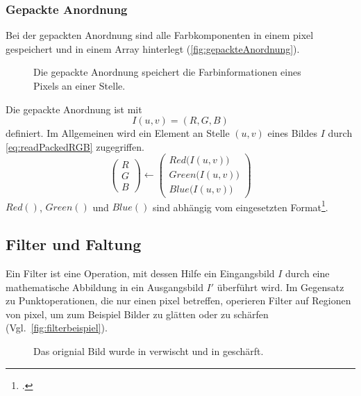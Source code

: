 \subsubsection{Gepackte Anordnung} %
\label{sub:gepackte_anordnung}
Bei der gepackten Anordnung sind alle Farbkomponenten in einem \gls{pixel} gespeichert und in einem Array hinterlegt
 (\autoref{fig:gepackteAnordnung}).
\begin{figure}[!ht]
	\centering
	
	\caption{Die gepackte Anordnung speichert die Farbinformationen eines Pixels an einer Stelle.}
	\label{fig:gepackteAnordnung}
\end{figure}
Die gepackte Anordnung ist mit
\begin{equation}
	I\left(u,v\right) = \left(R,G,B\right)
	\label{eq:packedImage}
\end{equation}
definiert. Im Allgemeinen wird ein Element an Stelle $(u,v)$ eines Bildes $I$ durch \autoref{eq:readPackedRGB}
 zugegriffen.
\begin{equation}
	\begin{pmatrix}
		R\\
		G\\
		B
	\end{pmatrix}
	\leftarrow
	\begin{pmatrix}
		Red\bigl(I\left(u,v\right)\bigr)\\
		Green\bigl(I\left(u,v\right)\bigr)\\
		Blue\bigl(I\left(u,v\right)\bigr)
	\end{pmatrix}
	\label{eq:readPackedRGB}
\end{equation}
$Red()$, $Green()$ und $Blue()$ sind abhängig vom eingesetzten Format\footcite[Vgl.][S.~236--237]{burger05}.


\subsection{Filter und Faltung} %
\label{sub:filter}
Ein Filter ist eine Operation, mit dessen Hilfe ein Eingangsbild $I$ durch eine mathematische Abbildung in ein
 Ausgangsbild $I'$ überführt wird. Im Gegensatz zu Punktoperationen, die nur einen \gls{pixel} betreffen, operieren
 Filter auf Regionen von \gls{pixel}, um zum Beispiel Bilder zu glätten oder zu schärfen
 (Vgl.~\autoref{fig:filterbeispiel}).
\begin{figure}[!ht]
	\centering
	\caption{Das orignial Bild  wurde in
	  verwischt und in  geschärft.}
	\label{fig:filterbeispiel}
\end{figure}


